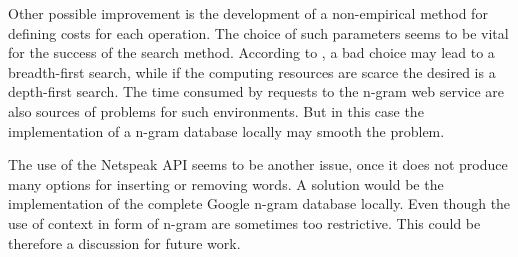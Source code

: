 \documentclass[11pt]{reportAlternative}
\begin{document}
Other possible improvement is the development of a non-empirical method for defining costs for each operation. The choice of such parameters seems to be vital for the success of the search method. According to \cite[p.~2023]{Stein}, a bad choice may lead to a breadth-first search, while if the computing resources are scarce the desired is a depth-first search. The time consumed by requests to the n-gram web service are also sources of problems for such environments. But in this case the implementation of a n-gram database locally may smooth the problem. \par

The use of the Netspeak API seems to be another issue, once it does not produce many options for inserting or removing words. A solution would be the implementation of the complete Google n-gram database locally. Even though the use of context in form of n-gram are sometimes too restrictive. This could be therefore a discussion for future work.
\end{document}
